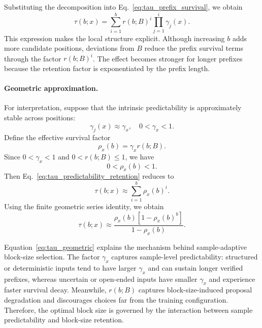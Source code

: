 \documentclass{article}
\begin{document}
Substituting the decomposition into Eq.~\eqref{eq:tau_prefix_survival}, we obtain
\begin{equation}
\label{eq:tau_predictability_retention}
\tau(b;x)
=
\sum_{i=1}^{b}
r(b;B)^i
\prod_{j=1}^{i}
\gamma_j(x).
\end{equation}
This expression makes the local structure explicit. Although increasing $b$ adds more candidate positions, deviations from $B$ reduce the prefix survival terms through the factor $r(b;B)^i$. The effect becomes stronger for longer prefixes because the retention factor is exponentiated by the prefix length.

\paragraph{Geometric approximation.}
For interpretation, suppose that the intrinsic predictability is approximately stable across positions:
\begin{equation}
\gamma_j(x)\approx \gamma_x,
\quad
0<\gamma_x<1.
\end{equation}
Define the effective survival factor
\begin{equation}
\rho_x(b)
=
\gamma_x r(b;B).
\end{equation}
Since $0<\gamma_x<1$ and $0<r(b;B)\le 1$, we have
\begin{equation}
0<\rho_x(b)<1.
\end{equation}
Then Eq.~\eqref{eq:tau_predictability_retention} reduces to
\begin{equation}
\tau(b;x)
\approx
\sum_{i=1}^{b}
\rho_x(b)^i.
\end{equation}
Using the finite geometric series identity, we obtain
\begin{equation}
\label{eq:tau_geometric}
\tau(b;x)
\approx
\frac{
\rho_x(b)
\left[
1-\rho_x(b)^b
\right]
}{
1-\rho_x(b)
}.
\end{equation}

Equation~\eqref{eq:tau_geometric} explains the mechanism behind sample-adaptive block-size selection. The factor $\gamma_x$ captures sample-level predictability: structured or deterministic inputs tend to have larger $\gamma_x$ and can sustain longer verified prefixes, whereas uncertain or open-ended inputs have smaller $\gamma_x$ and experience faster survival decay. Meanwhile, $r(b;B)$ captures block-size-induced proposal degradation and discourages choices far from the training configuration. Therefore, the optimal block size is governed by the interaction between sample predictability and block-size retention.
\end{document}
